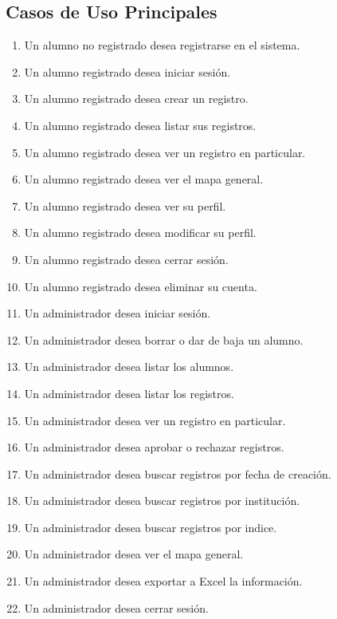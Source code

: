 		\subsection{Casos de Uso Principales}
			\begin{enumerate}[CU1: ]
				\itemsep-1em
				\item Un alumno no registrado desea registrarse en el sistema.
				\item Un alumno registrado desea iniciar sesión.
				\item Un alumno registrado desea crear un registro.
				\item Un alumno registrado desea listar sus registros.
				\item Un alumno registrado desea ver un registro en particular.
				\item Un alumno registrado desea ver el mapa general.
				\item Un alumno registrado desea ver su perfil.
				\item Un alumno registrado desea modificar su perfil.
				\item Un alumno registrado desea cerrar sesión.
				\item Un alumno registrado desea eliminar su cuenta.
				\item Un administrador desea iniciar sesión.
				\item Un administrador desea borrar o dar de baja un alumno.
				\item Un administrador desea listar los alumnos.
				\item Un administrador desea listar los registros.
				\item Un administrador desea ver un registro en particular.
				\item Un administrador desea aprobar o rechazar registros.
				\item Un administrador desea buscar registros por fecha de creación.
				\item Un administrador desea buscar registros por institución.
				\item Un administrador desea buscar registros por indice.
				\item Un administrador desea ver el mapa general.
				\item Un administrador desea exportar a Excel la información.
				\item Un administrador desea cerrar sesión.
			\end{enumerate}


	
